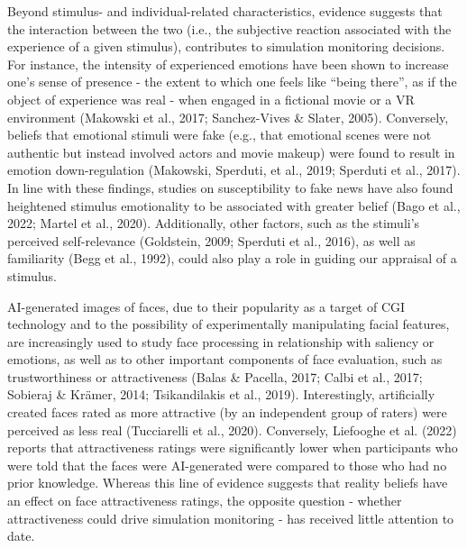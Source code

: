 \documentclass[
  man,floatsintext]{apa6}
\begin{document}
Beyond stimulus- and individual-related characteristics, evidence suggests that the interaction between the two (i.e., the subjective reaction associated with the experience of a given stimulus), contributes to simulation monitoring decisions. For instance, the intensity of experienced emotions have been shown to increase one's sense of presence - the extent to which one feels like ``being there'', as if the object of experience was real - when engaged in a fictional movie or a VR environment (Makowski et al., 2017; Sanchez-Vives \& Slater, 2005). Conversely, beliefs that emotional stimuli were fake (e.g., that emotional scenes were not authentic but instead involved actors and movie makeup) were found to result in emotion down-regulation (Makowski, Sperduti, et al., 2019; Sperduti et al., 2017). In line with these findings, studies on susceptibility to fake news have also found heightened stimulus emotionality to be associated with greater belief (Bago et al., 2022; Martel et al., 2020). Additionally, other factors, such as the stimuli's perceived self-relevance (Goldstein, 2009; Sperduti et al., 2016), as well as familiarity (Begg et al., 1992), could also play a role in guiding our appraisal of a stimulus.

AI-generated images of faces, due to their popularity as a target of CGI technology and to the possibility of experimentally manipulating facial features, are increasingly used to study face processing in relationship with saliency or emotions, as well as to other important components of face evaluation, such as trustworthiness or attractiveness (Balas \& Pacella, 2017; Calbi et al., 2017; Sobieraj \& Krämer, 2014; Tsikandilakis et al., 2019). Interestingly, artificially created faces rated as more attractive (by an independent group of raters) were perceived as less real (Tucciarelli et al., 2020). Conversely, Liefooghe et al. (2022) reports that attractiveness ratings were significantly lower when participants who were told that the faces were AI-generated were compared to those who had no prior knowledge. Whereas this line of evidence suggests that reality beliefs have an effect on face attractiveness ratings, the opposite question - whether attractiveness could drive simulation monitoring - has received little attention to date.
\end{document}
